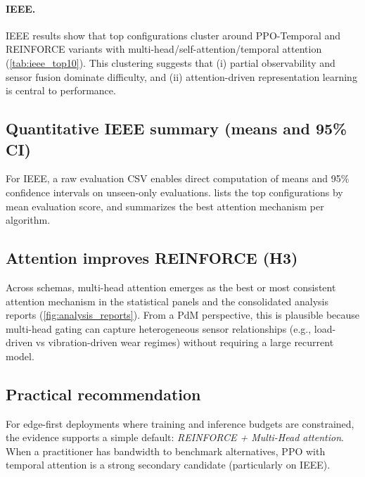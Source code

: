 \documentclass[11pt]{article}
\newcommand{\autorlTableRoot}{tables}
\renewcommand{\autorlTableRoot}{paper/tables}%
\begin{document}
\paragraph{IEEE.}
IEEE results show that top configurations cluster around PPO-Temporal and REINFORCE variants with multi-head/self-attention/temporal attention (\cref{tab:ieee_top10}). This clustering suggests that (i) partial observability and sensor fusion dominate difficulty, and (ii) attention-driven representation learning is central to performance.

\subsection{Quantitative IEEE summary (means and 95\% CI)}
\label{sec:ieee_summary}
For IEEE, a raw evaluation CSV enables direct computation of means and 95\% confidence intervals on unseen-only evaluations.  lists the top configurations by mean evaluation score, and  summarizes the best attention mechanism per algorithm.

\begin{table}[t]
	\centering
	\caption{Top IEEE configurations on unseen-only evaluations (mean and 95\% CI, aggregated across rounds and test files). Numbers are rounded to three decimals.}
	\label{tab:ieee_top10}
	
\end{table}

\begin{table}[t]
	\centering
	\caption{IEEE unseen-only: best attention mechanism per algorithm (mean evaluation score and 95\% CI).}
	\label{tab:ieee_best_attn}
	
\end{table}

\subsection{Attention improves REINFORCE (H3)}
Across schemas, multi-head attention emerges as the best or most consistent attention mechanism in the statistical panels and the consolidated analysis reports (\cref{fig:analysis_reports}). From a PdM perspective, this is plausible because multi-head gating can capture heterogeneous sensor relationships (e.g., load-driven vs vibration-driven wear regimes) without requiring a large recurrent model.

\subsection{Practical recommendation}
For edge-first deployments where training and inference budgets are constrained, the evidence supports a simple default: \emph{REINFORCE + Multi-Head attention}. When a practitioner has bandwidth to benchmark alternatives, PPO with temporal attention is a strong secondary candidate (particularly on IEEE).
\end{document}
